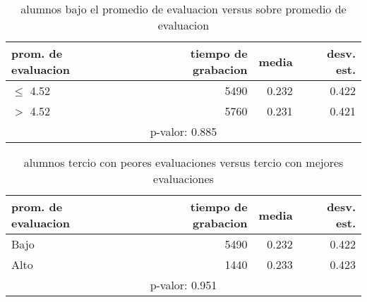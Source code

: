 \documentclass[spanish]{article}
\begin{document}
\begin{table}[h!]
\begin{center}
\begin{tabular}{|l|r|r|r|}
\hline
prom. de evaluacion & tiempo de grabacion & media          & desv. est.    \\ \hline
$\leq$ 4.52             &                5490 &          0.232 &          0.422\\ \hline
$>$ 4.52              &                5760 &          0.231 &          0.421\\ \hline
\multicolumn{4}{|c|}{p-valor: 0.885} \\ \hline
\end{tabular}
\caption{alumnos bajo el promedio de evaluacion versus sobre promedio de evaluacion}
\end{center}
\end{table}

\begin{table}[h!]
\begin{center}
\begin{tabular}{|l|r|r|r|}
\hline
prom. de evaluacion & tiempo de grabacion & media          & desv. est.    \\ \hline
Bajo                &                5490 &          0.232 &          0.422\\ \hline
Alto                &                1440 &          0.233 &          0.423\\ \hline
\multicolumn{4}{|c|}{p-valor: 0.951} \\ \hline
\end{tabular}
\caption{alumnos tercio con peores evaluaciones versus tercio con mejores evaluaciones}
\end{center}
\end{table}
\end{document}
